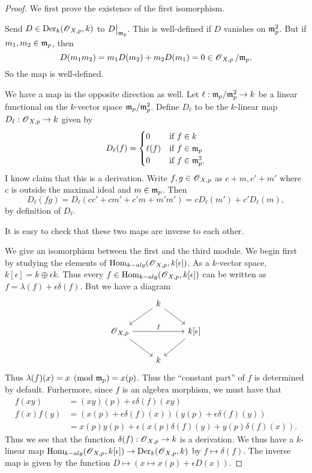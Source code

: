 \documentclass[11pt, english]{article}
\begin{document}
\begin{proof}
We first prove the existence of the first isomorphism.

Send $D \in \operatorname{Der}_k(\operatorname{\mathscr{O}}_{X,p},k)$ to $\restr{D}{\mm_p}$. This is well-defined if $D$ vanishes on $\mathfrak{m}_p^2$. But if $m_1,m_2 \in \mathfrak{m}_p$, then $$D(m_1m_2)=m_1D(m_2)+m_2D(m_1)=0 \in \operatorname{\mathscr{O}}_{X,p}/\mathfrak{m}_p.$$
So the map is well-defined.

We have a map in the opposite direction as well. Let $\ell:\mathfrak{m}_p/\mathfrak{m}_p^2 \to k$ be a linear functional on the $k$-vector space $\mathfrak{m}_p/\mathfrak{m}_p^2$. Define $D_\ell$ to be the $k$-linear map $D_\ell:\operatorname{\mathscr{O}}_{X,p} \to k$ given by
$$
D_\ell(f) = \begin{cases}
0 & \text{if $f \in k$} \\
\ell(f) & \text{if $f \in \mathfrak{m}_p$} \\
0 & \text{if $f \in \mathfrak{m}_p^2$}.
\end{cases}
$$
I know claim that this is a derivation. Write $f,g \in \operatorname{\mathscr{O}}_{X,p}$ as $c+m,c'+m'$ where $c$ is outside the maximal ideal and $m \in \mathfrak{m}_p$. Then
$$
D_\ell(fg)=D_\ell(cc'+cm'+c'm+m'm') = cD_\ell(m')+c'D_\ell(m),
$$
by definition of $D_\ell$.

It is easy to check that these two maps are inverse to each other.

We give an isomorphism between the first and the third module. We begin first by studying the elements of $\operatorname{Hom}_{k-alg}(\operatorname{\mathscr{O}}_{X,p},k[\epsilon])$. As a $k$-vector space, $k[\epsilon] = k \oplus \epsilon k$. Thus every $f \in \operatorname{Hom}_{k-alg}(\operatorname{\mathscr{O}}_{X,p},k[\epsilon])$ can be written as $f = \lambda(f) + \epsilon \delta(f)$. But we have a diagram
\[
\begin{tikzcd}
{}& k \arrow{dr} \arrow{dl} & \\
\OO_{X,p} \arrow{dr} \arrow{rr}{f} & & k[\epsilon] \arrow{dl} \\
 & k  
\end{tikzcd}
\]
Thus $\lambda(f)(x) = x \pmod {\mathfrak{m}_p}  = x(p)$. Thus the ``constant part'' of $f$ is determined by default. Furhermore, since $f$ is an algebra morphism, we must have that
\begin{align*}
  f(xy) &= (xy)(p) + \epsilon \delta(f)(xy) \\
f(x)f(y) &= (x(p)+\epsilon \delta(f)(x))(y(p)+\epsilon \delta(f)(y)) \\
&= x(p)y(p) + \epsilon \left( x(p) \delta(f)(y) + y(p) \delta(f)(x)\right).
\end{align*}
Thus we see that the function $\delta(f):\operatorname{\mathscr{O}}_{X,p} \to k$ is a derivation. We thus have a $k$-linear map $\operatorname{Hom}_{k-alg}(\operatorname{\mathscr{O}}_{X,p},k[\epsilon]) \to \operatorname{Der}_k(\operatorname{\mathscr{O}}_{X,p},k)$ by $f \mapsto \delta(f)$. The inverse map is given by the function $D \mapsto {(x \mapsto x(p) + \epsilon D(x))}$. 
\end{proof}
\end{document}
